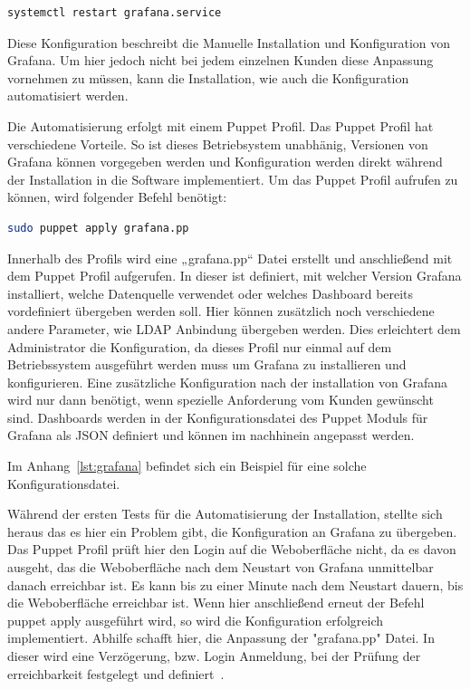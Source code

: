 \begin{lstlisting}[language=bash]
systemctl restart grafana.service
\end{lstlisting}

Diese Konfiguration beschreibt die Manuelle Installation und Konfiguration von
Grafana. Um hier jedoch nicht bei jedem einzelnen Kunden diese Anpassung
vornehmen zu müssen, kann die Installation, wie auch die Konfiguration
automatisiert werden.

Die Automatisierung erfolgt mit einem Puppet Profil. Das Puppet Profil hat
verschiedene Vorteile. So ist dieses Betriebsystem unabhänig, Versionen von
Grafana können vorgegeben werden und Konfiguration werden direkt während der
Installation in die Software implementiert. Um das Puppet Profil aufrufen zu
können, wird folgender Befehl benötigt:

\begin{lstlisting}[language=bash]
sudo puppet apply grafana.pp
\end{lstlisting}

Innerhalb des Profils wird eine „grafana.pp“ Datei erstellt und anschließend
mit dem Puppet Profil aufgerufen. In dieser ist definiert, mit welcher Version
Grafana installiert, welche Datenquelle verwendet oder welches Dashboard
bereits vordefiniert übergeben werden soll. Hier können zusätzlich noch
verschiedene andere Parameter, wie LDAP Anbindung übergeben werden. Dies
erleichtert dem Administrator die Konfiguration, da dieses Profil nur einmal
auf dem Betriebssystem ausgeführt werden muss um Grafana zu installieren und
konfigurieren. Eine zusätzliche Konfiguration nach der installation von Grafana
wird nur dann benötigt, wenn spezielle Anforderung vom Kunden gewünscht sind.
Dashboards werden in der Konfigurationsdatei des Puppet Moduls für Grafana als
\gls{JSON} definiert und können im nachhinein angepasst werden.

Im Anhang~\ref{lst:grafana} befindet sich ein Beispiel für eine solche
Konfigurationsdatei.

Während der ersten Tests für die Automatisierung der Installation, stellte sich
heraus das es hier ein Problem gibt, die Konfiguration an Grafana zu übergeben.
Das Puppet Profil prüft hier den Login auf die Weboberfläche nicht, da es davon
ausgeht, das die Weboberfläche nach dem Neustart von Grafana unmittelbar danach
erreichbar ist. Es kann bis zu einer Minute nach dem Neustart dauern, bis die
Weboberfläche erreichbar ist.  Wenn hier anschließend erneut der Befehl puppet
apply ausgeführt wird, so wird die Konfiguration erfolgreich implementiert.
Abhilfe schafft hier, die Anpassung der "grafana.pp" Datei. In dieser wird eine
Verzögerung, bzw. Login Anmeldung, bei der Prüfung der erreichbarkeit
festgelegt und definiert~\cite{grafana-issue}.
\mr%


